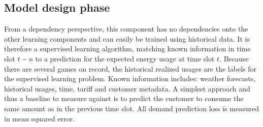 
%
%

\subsection{Model design phase}%
\label{sub:model_design}



From a dependency perspective, this component has no dependencies onto the other learning components and can easily be
trained using historical data. It is therefore a supervised learning algorithm, matching known information in time slot
$t-n$ to a prediction for the expected energy usage at time slot $t$. Because there are several games on record, the
historical realized usages are the labels for the supervised learning problem. Known information includes: weather
forecasts, historical usages, time, tariff and customer metadata. A simplest approach and thus a baseline to
measure against is to predict the customer to consume the same amount as in the previous time slot. All demand
prediction loss is measured in mean squared error.

